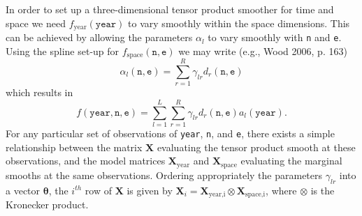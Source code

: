 \documentclass[10pt] {article}
\theoremstyle{definition}
\theoremstyle{plain}
\begin{document}
In order to set up a three-dimensional tensor product smoother for time and space we need $f_\text{year}(\texttt{year})$ to vary smoothly within the space dimensions. This can be achieved by allowing the parameters $\alpha_l$ to vary smoothly with \texttt{n} and \texttt{e}. Using the spline set-up for $f_\text{space}(\texttt{n},\texttt{e})$ we may write (e.g., Wood 2006, p. 163)
$$
\alpha_l(\texttt{n},\texttt{e})=\sum_{r=1}^R \gamma_{lr} d_r(\texttt{n},\texttt{e})
$$    
which results in
$$
f(\texttt{year},\texttt{n},\texttt{e})=\sum_{l=1}^L \sum_{r=1}^R \gamma_{lr} d_r(\texttt{n},\texttt{e}) a_l(\texttt{year}). 
$$
For any particular set of observations of \texttt{year}, \texttt{n}, and \texttt{e}, there exists a simple relationship between the matrix $\textbf{X}$ evaluating the tensor product smooth at these observations, and the model matrices $\textbf{X}_\text{year}$ and $\textbf{X}_\text{space}$ evaluating the marginal smooths at the same observations. Ordering appropriately the parameters $\gamma_{lr}$ into a vector $\bm\theta$, the $i^{th}$ row of $\textbf{X}$ is given by $\textbf{X}_{i}=\textbf{X}_\text{year,i}\otimes\textbf{X}_\text{space,i}$, where $\otimes$ is the Kronecker product. 
\end{document}
